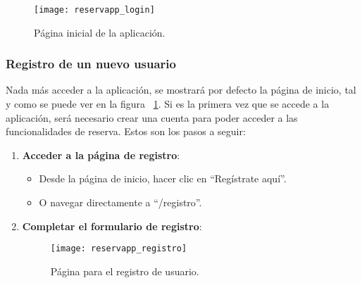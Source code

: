 \begin{figure}[H]
	\centering
		\texttt{[image: reservapp\_login]}
	\caption{Página inicial de la aplicación.}
	\label{fig:reservapp_login}
\end{figure}

\subsubsection{Registro de un nuevo usuario}
Nada más acceder a la aplicación, se mostrará por defecto la página de inicio, tal y como se puede ver en la figura ~\ref{fig:reservapp_login}. Si es la primera vez que se accede a la aplicación, será necesario crear una cuenta para poder acceder a las funcionalidades de reserva. Estos son los pasos a seguir:

\begin{enumerate}
   \item \textbf{Acceder a la página de registro}:

   \begin{itemize}
      \item Desde la página de inicio, hacer clic en ``Regístrate aquí''.
      \item O navegar directamente a ``/registro''.
   \end{itemize}
   \item \textbf{Completar el formulario de registro}:
   \begin{itemize}

      \begin{figure}[H]
         \centering
         \texttt{[image: reservapp\_registro]}
         \caption{Página para el registro de usuario.}
         \label{fig:reservapp_registro}
      \end{figure}


\end{itemize}
\end{enumerate}
